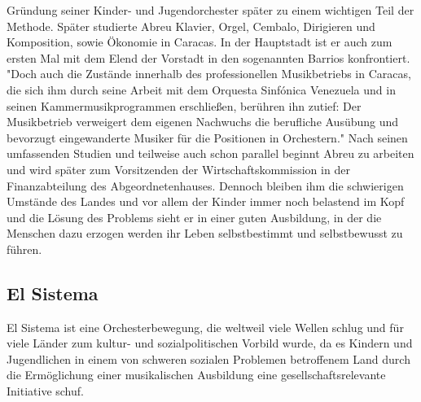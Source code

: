 Gründung seiner Kinder- und Jugendorchester später zu einem wichtigen Teil der
Methode. Später studierte Abreu Klavier, Orgel, Cembalo, Dirigieren und
Komposition, sowie Ökonomie in Caracas. In der Hauptstadt ist er auch zum ersten
Mal mit dem Elend der Vorstadt in den sogenannten Barrios konfrontiert. "Doch
auch die Zustände innerhalb des professionellen Musikbetriebs in Caracas, die
sich ihm durch seine Arbeit mit dem Orquesta Sinfónica Venezuela und in seinen
Kammermusikprogrammen erschließen, berühren ihn zutief: Der Musikbetrieb
verweigert dem eigenen Nachwuchs die berufliche Ausübung und bevorzugt
eingewanderte Musiker für die Positionen in
Orchestern."\autocite[28]{kaufmann:el_sistema} Nach seinen umfassenden Studien
und teilweise auch schon parallel beginnt Abreu zu arbeiten und wird später
zum Vorsitzenden der Wirtschaftskommission in der Finanzabteilung des
Abgeordnetenhauses. Dennoch bleiben ihm die schwierigen Umstände des Landes und
vor allem der Kinder immer noch belastend im Kopf und die Lösung des Problems
sieht er in einer guten Ausbildung, in der die Menschen dazu erzogen werden ihr
Leben selbstbestimmt und selbstbewusst zu
führen.\autocite[31]{kaufmann:el_sistema} 



\subsection{El Sistema}
El Sistema ist eine Orchesterbewegung, die weltweil viele Wellen schlug und für
viele Länder zum kultur- und sozialpolitischen Vorbild wurde, da es Kindern und
Jugendlichen in einem von schweren sozialen Problemen betroffenem Land durch die
Ermöglichung einer musikalischen Ausbildung eine gesellschaftsrelevante
Initiative schuf. 

